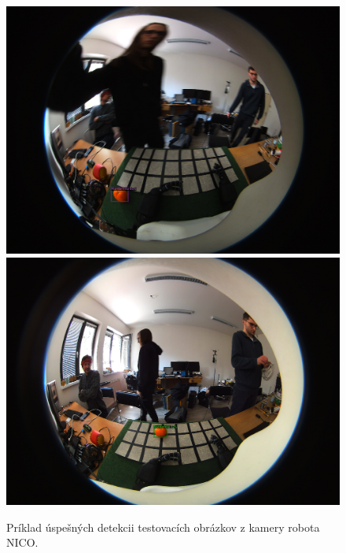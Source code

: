 \begin{figure}[H]
\includegraphics[width=\textwidth]{images/detections_screenshot1.png}
\includegraphics[width=\textwidth]{images/detections_screenshot2.png}
\centering
\caption{Príklad úspešných detekcii testovacích obrázkov z kamery robota NICO.}
\label{fig:image701}
\end{figure}

